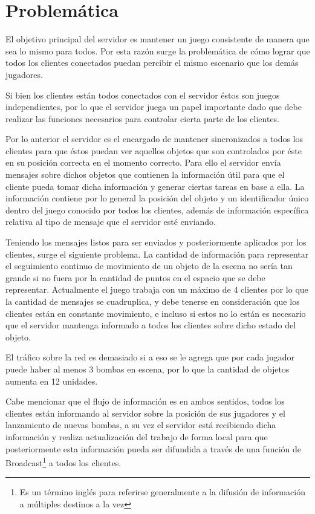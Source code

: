 \documentclass[a4paper,12pt,openany,oneside]{book}
\begin{document}
\section{Problemática} 
El objetivo principal del servidor es mantener un juego consistente de manera que sea lo mismo para todos. Por esta razón surge la problemática de cómo lograr que todos los clientes conectados puedan percibir el mismo escenario que los demás jugadores. 

Si bien los clientes están todos conectados con el servidor éstos son juegos independientes, por lo que el servidor juega un papel importante dado que debe realizar las funciones necesarios para controlar cierta parte de los clientes.

Por lo anterior el servidor es el encargado de mantener sincronizados a todos los clientes para que éstos puedan ver aquellos objetos que son controlados por éste en su posición correcta en el momento correcto. Para ello el servidor envía mensajes sobre dichos objetos que contienen la información útil para que el cliente pueda tomar dicha información y generar ciertas tareas en base a ella. La información contiene por lo general la posición del objeto y un identificador único dentro del juego conocido por todos los clientes, además de información específica relativa al tipo de mensaje que el servidor esté enviando.

Teniendo los mensajes listos para ser enviados y posteriormente aplicados por los clientes, surge el siguiente problema. La cantidad de información para representar el seguimiento continuo de movimiento de un objeto de la escena no sería tan grande si no fuera por la cantidad de puntos en el espacio que se debe representar. Actualmente el juego trabaja con un máximo de 4 clientes por lo que la cantidad de mensajes se cuadruplica, y debe tenerse en consideración que los clientes están en constante movimiento, e incluso si estos no lo están es necesario que el servidor mantenga informado a todos los clientes sobre dicho estado del objeto.

El tráfico sobre la red es demasiado si a eso se le agrega que por cada jugador puede haber al menos 3 bombas en escena, por lo que la cantidad de objetos aumenta en 12 unidades. 

Cabe mencionar que el flujo de información es en ambos sentidos, todos los clientes están informando al servidor sobre la posición de sus jugadores y el lanzamiento de nuevas bombas, a su vez el servidor está recibiendo dicha información y realiza actualización del trabajo de forma local para que posteriormente esta información pueda ser difundida a través de una función de Broadcast\footnote{Es un término inglés para referirse generalmente a la difusión de información a múltiples destinos a la vez} a todos los clientes.
\end{document}
